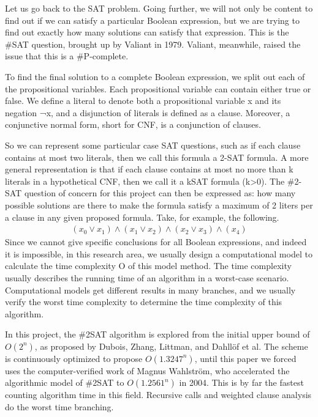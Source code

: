 \documentclass{sigchi}
\begin{document}
Let us go back to the SAT problem. Going further, we will not only be content to find out if we can satisfy a particular Boolean expression, but we are trying to find out exactly how many solutions can satisfy that expression. This is the \#SAT question, brought up by Valiant in 1979.\cite{10.1016/0304-3975(79)90044-6} Valiant, meanwhile, raised the issue that this is a \#P-complete.

To find the final solution to a complete Boolean expression, we split out each of the propositional variables. Each propositional variable can contain either true or false. We define a literal to denote both a propositional variable x and its negation ¬x, and a disjunction of literals is defined as a clause.\cite{10.1016/j.tcs.2004.10.037}  Moreover, a conjunctive normal form, short for CNF, is a conjunction of clauses.\cite{10.1016/j.tcs.2004.10.037} 

So we can represent some particular case SAT questions, such as if each clause contains at most two literals, then we call this formula a 2-SAT formula.\cite{10.1007/s10817-006-9041-2} A more general representation is that if each clause contains at most no more than k literals in a hypothetical CNF, then we call it a k\-SAT formula (k>0).\cite{10.1007/s10817-006-9041-2} The \#2-SAT question of concern for this project can then be expressed as: how many possible solutions are there to make the formula satisfy a maximum of 2 liters per a clause in any given proposed formula. Take, for example, the following.
\begin{align*}  
\left ( x_{0}\vee x_{1} \right )\wedge \left ( x_{1}\vee x_{2} \right )\wedge \left ( x_{2}\vee  x_{3} \right )\wedge \left ( x_{4}\right )
\end{align*}
Since we cannot give specific conclusions for all Boolean expressions, and indeed it is impossible, in this research area, we usually design a computational model to calculate the time complexity O of this model method. \cite{10.1007/978-3-540-69507-3}The time complexity usually describes the running time of an algorithm in a worst-case scenario. Computational models get different results in many branches, and we usually verify the worst time complexity to determine the time complexity of this algorithm.

In this project, the \#2SAT algorithm is explored from the initial upper bound of $ O\left ( 2^{n} \right )$\cite{10.1016/0304-3975(79)90044-6}, as proposed by Dubois, Zhang, Littman, and Dahllöf\cite{10.1007/3-540-45655-4_57} et al. The scheme is continuously optimized to propose $ O\left ( 1.3247^{n} \right )$, until this paper we forced uses the computer-verified work of Magnus Wahlström, who accelerated the algorithmic model of \#2SAT to $ O\left ( 1.2561^{n} \right )$ in 2004\cite{10.1016/j.tcs.2004.10.037}. This is by far the fastest counting algorithm time in this field.\cite{Lee} Recursive calls and weighted clause analysis do the worst time branching.
\end{document}
